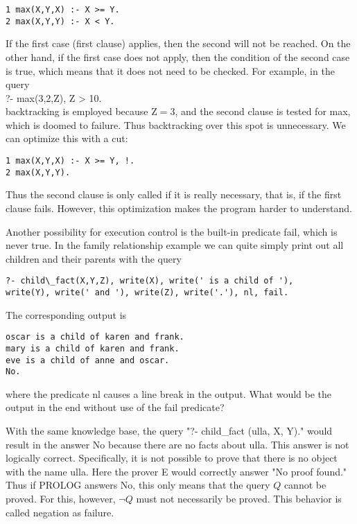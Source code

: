 \documentclass[10pt]{article}
\begin{document}
\begin{verbatim}
1 max(X,Y,X) :- X >= Y.
2 max(X,Y,Y) :- X < Y.
\end{verbatim}

If the first case (first clause) applies, then the second will not be reached. On the other hand, if the first case does not apply, then the condition of the second case is true, which means that it does not need to be checked. For example, in the query\\
?- max(3,2,Z), Z > 10.\\
backtracking is employed because $\mathrm{Z}=3$, and the second clause is tested for max, which is doomed to failure. Thus backtracking over this spot is unnecessary. We can optimize this with a cut:

\begin{verbatim}
1 max(X,Y,X) :- X >= Y, !.
2 max(X,Y,Y).
\end{verbatim}

Thus the second clause is only called if it is really necessary, that is, if the first clause fails. However, this optimization makes the program harder to understand.

Another possibility for execution control is the built-in predicate fail, which is never true. In the family relationship example we can quite simply print out all children and their parents with the query

\begin{verbatim}
?- child\_fact(X,Y,Z), write(X), write(' is a child of '),
write(Y), write(' and '), write(Z), write('.'), nl, fail.
\end{verbatim}

The corresponding output is

\begin{verbatim}
oscar is a child of karen and frank.
mary is a child of karen and frank.
eve is a child of anne and oscar.
No.
\end{verbatim}

where the predicate nl causes a line break in the output. What would be the output in the end without use of the fail predicate?

With the same knowledge base, the query "?- child\_fact (ulla, X, Y)." would result in the answer No because there are no facts about ulla. This answer is not logically correct. Specifically, it is not possible to prove that there is no object with the name ulla. Here the prover E would correctly answer "No proof found." Thus if PROLOG answers No, this only means that the query $Q$ cannot be proved. For this, however, $\neg Q$ must not necessarily be proved. This behavior is called negation as failure.
\end{document}
